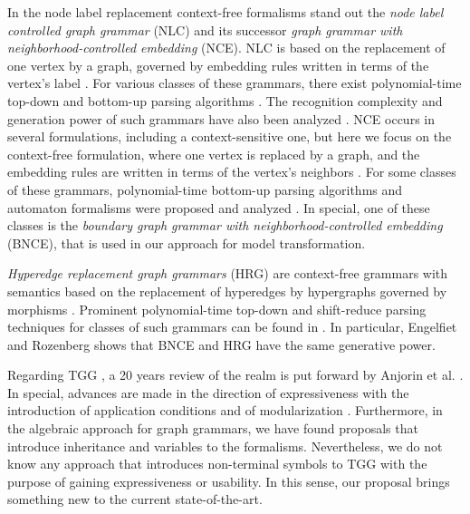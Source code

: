 \documentclass[runningheads]{llncs}
\begin{document}
In the node label replacement context-free formalisms stand out the \textit{node label controlled graph grammar} (NLC) and its successor \textit{graph grammar with neighborhood-controlled embedding} (NCE). NLC is based on the replacement of one vertex by a graph, governed by embedding rules written in terms of the vertex's label \cite{rozenberg1986boundary}. For various classes of these grammars, there exist polynomial-time top-down and bottom-up parsing algorithms \cite{flasinski1993parsing,flasinski2014characteristics,rozenberg1986boundary,wanke1991algorithms}. The recognition complexity and generation power of such grammars have also been analyzed \cite{flasinski1998power,kim2012structure}. NCE occurs in several formulations, including a context-sensitive one, but here we focus on the context-free formulation, where one vertex is replaced by a graph, and the embedding rules are written in terms of the vertex's neighbors \cite{janssens1982graph,skodinis1998neighborhood}. For some classes of these grammars, polynomial-time bottom-up parsing algorithms and automaton formalisms were proposed and analyzed \cite{kim2001efficient,brandenburg2005finite}. In special, one of these classes is the \textit{boundary graph grammar with neighborhood-controlled embedding} (BNCE), that is used in our approach for model transformation.

\textit{Hyperedge replacement graph grammars} (HRG) are context-free grammars with semantics based on the replacement of hyperedges by hypergraphs governed by morphisms \cite{drewes1997hyperedge}. Prominent polynomial-time top-down and shift-reduce parsing techniques for classes of such grammars can be found in \cite{drewes2015predictive,drewes2017predictive}. In particular, Engelfiet and Rozenberg \cite{engelfiet1990comparison} shows that BNCE and HRG have the same generative power.

Regarding TGG \cite{schurr1994specification}, a 20 years review of the realm is put forward by Anjorin et al. \cite{anjorin201620}. In special, advances are made in the direction of expressiveness with the introduction of application conditions \cite{klar2010extended} and of modularization \cite{anjorin2014modularizing}. Furthermore, in the algebraic approach for graph grammars, we have found proposals that introduce inheritance \cite{bardohl2004integrating,hermann2008typed} and variables \cite{hoffmann2005graph} to the formalisms. Nevertheless, we do not know any approach that introduces non-terminal symbols to TGG with the purpose of gaining expressiveness or usability. In this sense, our proposal brings something new to the current state-of-the-art.
\end{document}
